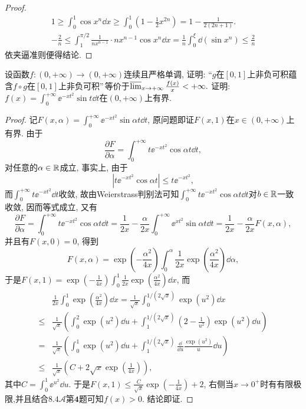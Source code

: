 \begin{quizb}
\begin{proof}
\begin{gather*}
1\geqslant\int_{0}^{1}\cos x^n\dd x\geqslant\int_{0}^{1}\left(1-\frac{1}{2}x^{2n}\right)=1-\frac{1}{2(2n+1)}.\\
-\frac{2}{n}\leqslant\int_{1}^{\pi/2}\frac{1}{nx^{n-1}}\cdot nx^{n-1}\cos x^n\dd x=\frac{1}{n}\int_{0}^{\xi}\dd\left(\sin x^n\right)\leqslant\frac{2}{n}
\end{gather*}
依夹逼准则便得结论.
\end{proof}
\woe 设函数\(f:(0,+\infty)\rightarrow(0,+\infty)\)连续且严格单调, 证明: “\(g\)在\([0,1]\)上非负可积蕴含\(f\circ g\)在\([0,1]\)上非负可积”\(\,\)等价于\(\varlimsup_{x\rightarrow+\infty}\frac{f(x)}{x}<+\infty.\)
\woe 证明: \(f(x)=\int_{0}^{+\infty}\ee^{-xt^2}\sin t\dd t\)在\((0,+\infty)\)上有界.
\begin{proof}
记\(F(x,\alpha)=\int_{0}^{+\infty}\ee^{-xt^2}\sin\alpha t\dd t\), 原问题即证\(F(x,1)\)在\(x\in (0,+\infty)\)上有界. 由于\[\frac{\partial F}{\partial \alpha}=\int_{0}^{+\infty}t\ee^{-xt^2}\cos\alpha t\dd t,\]对任意的\(\alpha\in\mathbb{R}\)成立, 事实上, 由于\[\left|t\ee^{-xt^2}\cos\alpha t\right|\leqslant t\ee^{-xt^2},\]而\(\int_{0}^{+\infty}t\ee^{-xt^2}\dd t\)收敛, 故由Weierstrass判别法可知\(\int_{0}^{+\infty}t\ee^{-xt^2}\cos\alpha t\dd t\)对\(b\in\mathbb{R}\)一致收敛, 因而等式成立, 又有\[\frac{\partial F}{\partial \alpha}=\int_{0}^{+\infty}t\ee^{-xt^2}\cos\alpha t\dd t=\frac{1}{2x}-\frac{\alpha}{2x}\int_{0}^{+\infty}\ee^{xt^2}\sin\alpha t\dd t=\frac{1}{2x}-\frac{\alpha}{2x}F(x,\alpha),\]并且有\(F(x,0)=0\), 得到\[F(x,\alpha)=\exp\left(-\frac{\alpha^2}{4x}\right)\int_{0}^{\alpha}\frac{1}{2x}\exp\left(\frac{\alpha^2}{4x}\right)\dd\alpha,\]于是\(F(x,1)=\exp\left(-\frac{1}{4x}\right)\int_{0}^{1}\frac{1}{2x}\exp\left(\frac{\alpha^2}{4x}\right)\dd x\), 而\[\begin{split}
&\frac{1}{2x}\int_{0}^{1}\exp\left(\frac{\alpha^2}{4x}\right)\dd x=\frac{1}{\sqrt{x}}\int_{0}^{1/(2\sqrt{x})}\exp\left(u^2\right)\dd x\\\leqslant&\frac{1}{\sqrt{x}}\left(\int_{0}^{2}\exp\left(u^2\right)\dd u+\int_{1}^{1/(2\sqrt{x})}\left(2-\frac{1}{u^2}\right)\exp\left(u^2\right)\dd u\right)\\=&\frac{1}{\sqrt{x}}\left(\int_{0}^{1}\exp\left(u^2\right)\dd u+\int_{1}^{1/(2\sqrt{x})}\frac{\dd}{\dd u}\frac{\exp(u^2)}{u}\dd u\right)\\\leqslant&\frac{1}{\sqrt{x}}\left(C+2\sqrt{x}\exp\left(\frac{1}{4x}\right)\right),
\end{split}\]其中\(C=\int_{0}^{1}\ee^{u^2}\dd u\). 于是\(F(x,1)\leqslant\frac{C}{\sqrt{x}}\exp\left(-\frac{1}{4x}\right)+2\), 右侧当\(x\rightarrow 0^+\)时有有限极限,并且结合\(\boldsymbol{8.4 \mathcal{A}}\)第\(\boldsymbol{4}\)题可知\(f(x)>0\). 结论即证.

\end{proof}
\end{quizb}
